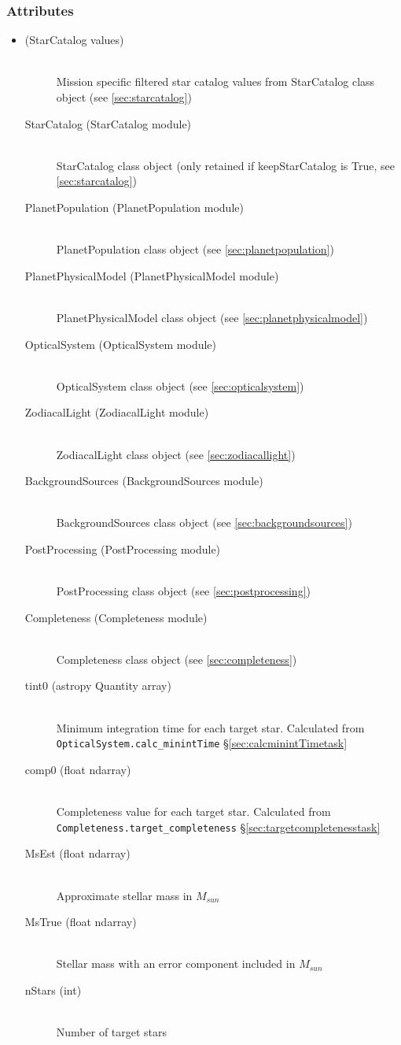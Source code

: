 \documentclass[cleanfoot]{asme2ej}
\begin{document}
\subsubsection*{Attributes}
\begin{itemize}
\item 
\begin{description}
    \item[(StarCatalog values)] \hfill \\ Mission specific filtered star catalog values from StarCatalog class object (see \ref{sec:starcatalog})
    \item[StarCatalog (StarCatalog module)]\hfill \\ StarCatalog class object (only retained if keepStarCatalog is True, see \ref{sec:starcatalog})
    \item[PlanetPopulation (PlanetPopulation module)] \hfill \\ PlanetPopulation class object (see \ref{sec:planetpopulation})
    \item[PlanetPhysicalModel (PlanetPhysicalModel module)] \hfill \\ PlanetPhysicalModel class object (see \ref{sec:planetphysicalmodel})
    \item[OpticalSystem (OpticalSystem module)] \hfill \\ OpticalSystem class object (see \ref{sec:opticalsystem})
    \item[ZodiacalLight (ZodiacalLight module)] \hfill \\ ZodiacalLight class object (see \ref{sec:zodiacallight})
    \item[BackgroundSources (BackgroundSources module)] \hfill \\ BackgroundSources class object (see \ref{sec:backgroundsources})
    \item[PostProcessing (PostProcessing module)] \hfill \\ PostProcessing class object (see \ref{sec:postprocessing})
    \item[Completeness (Completeness module)] \hfill \\ Completeness class object (see \ref{sec:completeness})
    \item[tint0 (astropy Quantity array)] \hfill \\ Minimum integration time for each target star. Calculated from \verb+OpticalSystem.calc_minintTime+ \S\ref{sec:calcminintTimetask}
    \item[comp0 (float ndarray)] \hfill \\ Completeness value for each target star. Calculated from \verb+Completeness.target_completeness+ \S\ref{sec:targetcompletenesstask}
    \item[MsEst (float ndarray)] \hfill \\ Approximate stellar mass in $ M_{sun} $
    \item[MsTrue (float ndarray)] \hfill \\ Stellar mass with an error component included in $ M_{sun} $
    \item[nStars (int)] \hfill \\ Number of target stars
\end{description}
\end{itemize}
\end{document}
